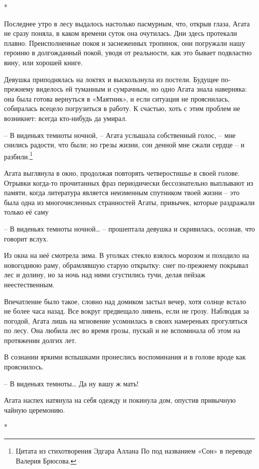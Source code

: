 \documentclass[
  a5paperpaper,
  DIV=11,
  numbers=noendperiod]{scrreprt}
\begin{document}
*

Последнее утро в лесу выдалось настолько пасмурным, что, открыв глаза,
Агата не сразу поняла, в каком времени суток она очутилась. Дни здесь
протекали плавно. Преисполненные покоя и заснеженных тропинок, они
погружали нашу героиню в долгожданный покой, уводя от реальности, как
это бывает подвластно вину, или хорошей книге.

Девушка приподнялась на локтях и выскользнула из постели. Будущее
по-прежнему виделось ей туманным и сумрачным, но одно Агата знала
наверняка: она была готова вернуться в «Маятник», и если ситуация не
прояснилась, собиралась всецело погрузиться в работу. К счастью, хоть с
этим проблем не возникнет: всегда кто-нибудь да умирал.

-- В виденьях темноты ночной, -- Агата услышала собственный голос, --
мне снились радости, что были; но грезы жизни, сон денной мне сжали
сердце -- и разбили.\footnote{Цитата из стихотворения Эдгара Аллана По
  под названием «Сон» в переводе Валерия Брюсова.}

Агата выглянула в окно, продолжая повторять четверостишье в своей
голове. Отрывки когда-то прочитанных фраз периодически бессознательно
выплывают из памяти, когда литература является неизменным спутником
твоей жизни -- это была одна из многочисленных странностей Агаты,
привычек, которые раздражали только её саму

-- В виденьях темноты ночной\ldots{} -- прошептала девушка и скривилась,
осознав, что говорит вслух.

Из окна на неё смотрела зима. В уголках стекло взялось морозом и
походило на новогоднюю раму, обрамлявшую старую открытку: снег
по-прежнему покрывал лес и долину, но за ночь над ними сгустились тучи,
делая пейзаж неестественным.

Впечатление было такое, словно над домиком застыл вечер, хотя солнце
встало не более часа назад. Все вокруг предвещало ливень, если не грозу.
Наблюдая за погодой, Агата лишь на мгновение усомнилась в своих
намереньях прогуляться по лесу. Она любила лес во время грозы, пускай и
не вспоминала об этом на протяжении долгих лет.

В сознании яркими вспышками пронеслись воспоминания и в голове вроде как
прояснилось.

-- В виденьях темноты\ldots{} Да ну вашу ж мать!

Агата наспех натянула на себя одежду и покинула дом, опустив привычную
чайную церемонию.

*
\end{document}
